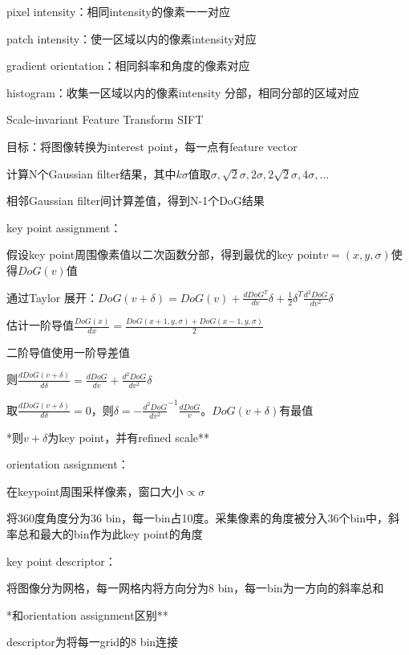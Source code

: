 \documentclass[UTF8]{ctexart}
\begin{document}
  \quad pixel intensity：相同intensity的像素一一对应

  \quad patch intensity：使一区域以内的像素intensity对应

  \quad gradient orientation：相同斜率和角度的像素对应

  \quad histogram：收集一区域以内的像素intensity 分部，相同分部的区域对应

  Scale-invariant Feature Transform SIFT

  \quad 目标：将图像转换为interest point，每一点有feature vector

  \quad 计算N个Gaussian filter结果，其中$k\sigma$值取$\sigma, \sqrt{2}\sigma, 2\sigma, 2\sqrt{2}\sigma, 4\sigma,...$

  \quad 相邻Gaussian filter间计算差值，得到N-1个DoG结果

  \quad key point assignment：
  
  \quad \quad 假设key point周围像素值以二次函数分部，得到最优的key point$v = (x, y, \sigma)$使得$DoG(v)$值

  \quad \quad 通过Taylor 展开：$DoG(v + \delta) = DoG(v) + \frac{dDoG^T}{dv}\delta + \frac{1}{2}\delta^T\frac{d^2DoG}{dv^2}\delta$

  \quad \quad \quad 估计一阶导值$\frac{DoG(x)}{dx} = \frac{DoG(x + 1, y, \sigma) + DoG(x - 1, y, \sigma)}{2}$

  \quad \quad \quad 二阶导值使用一阶导差值

  \quad \quad 则$\frac{dDoG(v + \delta)}{d\delta} = \frac{dDoG}{dv} + \frac{d^2DoG}{dv^2}\delta$

  \quad \quad 取$\frac{dDoG(v + \delta)}{d\delta} = 0$，则$\delta = -\frac{d^2DoG}{dv^2}^{-1}\frac{dDoG}{v}$。$DoG(v + \delta)$有最值

  \quad \quad **则$v + \delta$为key point，并有refined scale**

  \quad orientation assignment：

  \quad \quad 在keypoint周围采样像素，窗口大小$\propto \sigma$

  \quad \quad 将360度角度分为36 bin，每一bin占10度。采集像素的角度被分入36个bin中，斜率总和最大的bin作为此key point的角度

  \quad key point descriptor：
  
  \quad \quad 将图像分为网格，每一网格内将方向分为8 bin，每一bin为一方向的斜率总和

  \quad \quad \quad **和orientation assignment区别**

  \quad \quad descriptor为将每一grid的8 bin连接
\end{document}
